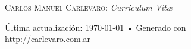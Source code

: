 \documentclass[10pt, a4paper]{article}
\begin{document}
% 
\thispagestyle{empty}
{\Large \textsc{Carlos Manuel Carlevaro}: \textit{Curriculum Vit{\ae}}}

\hrulefill













% 

\vspace{1cm}
\vfill{}
\begin{center}
{\scriptsize  Última actualización: \today\- •\- 
Generado con \href{http://es.wikipedia.org/wiki/XeLaTeX}{
\XeTeX }\\
\href{http://carlevaro.com.ar}{http://carlevaro.com.ar}}
\end{center}
\end{document}

